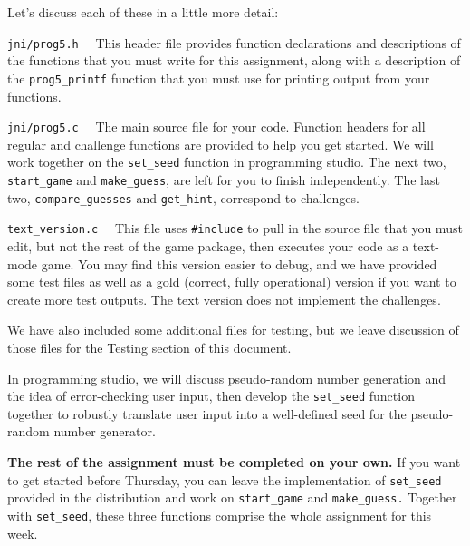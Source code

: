 Let's discuss each of these in a little more detail:

\begin{list}{x}{\setlength{\leftmargin}{1.5in}\setlength{\rightmargin}{0.5in}\setlength{\labelwidth}{1.25in}\setlength{\itemsep}{0pt}\setlength{\parskip}{0pt}\setlength{\parsep}{0pt}}
\item[{\tt jni/prog5.h}~~]{This header file provides function declarations
and descriptions of the functions that you must write for this assignment,
along with a description of the {\tt prog5\_printf} function that you must
use for printing output from your functions.}
\item[{\tt jni/prog5.c}~~]{The main source file for your code.
Function headers for all regular and challenge functions are provided
to help you get started.  We will work together on the {\tt set\_seed}
function in programming studio.  The next two, {\tt start\_game} 
and {\tt make\_guess}, are left for you to finish independently.
The last two, {\tt compare\_guesses} and {\tt get\_hint},
correspond to challenges.}
\item[{\tt text\_version.c}~~]{This file uses {\tt \#include} to
pull in the source file that you
must edit, but not the rest of the game package, then executes
your code as a text-mode game.
You may find this version easier to debug, and we have provided 
some test files as well as a gold (correct, fully operational) version
if you want to create more test outputs.  The text version does not
implement the challenges.}
\end{list}

We have also included some additional files for testing, but we leave 
discussion of those files
for the Testing section of this document.

In programming studio, we will discuss pseudo-random number generation
and the idea of error-checking user input, then develop the {\tt set\_seed}
function together to robustly translate user input into a well-defined
seed for the pseudo-random number generator.  

{\bf The rest of the assignment must be completed on your own.}
%
If you want to get started before Thursday, you can leave the implementation
of {\tt set\_seed} provided in the distribution and work on {\tt start\_game}
and {\tt make\_guess.}  Together with {\tt set\_seed}, these three functions
comprise the whole assignment for this week.\\


